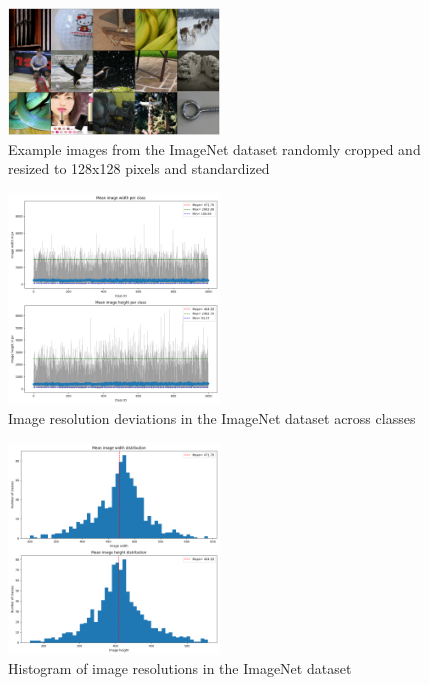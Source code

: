 \begin{figure}
        \centering
        \includegraphics[width=0.5\textwidth]{../../sample_images/imagenet_unnormalized}
        \caption{Example images from the ImageNet dataset randomly cropped and resized to 128x128 pixels and standardized}
        \label{fig:imnet_example_normalized}
    \end{figure}

    \begin{figure}
        \centering
        \includegraphics[width=0.5\textwidth]{../../sample_images/imagenet_sizes_errorbar}
        \caption{Image resolution deviations in the ImageNet dataset across classes}
        \label{fig:imnet_sizes_err}
    \end{figure}

    \begin{figure}
        \centering
        \includegraphics[width=0.5\textwidth]{../../sample_images/imagenet_sizes_histogram}
        \caption{Histogram of image resolutions in the ImageNet dataset}
        \label{fig:imnet_sizes_hist}
    \end{figure}

